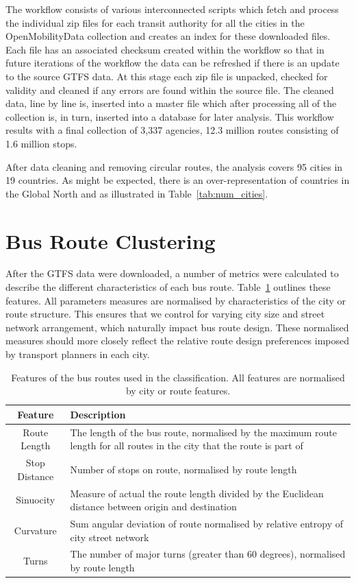 \documentclass[11pt]{article}
\begin{document}
The workflow consists of various interconnected scripts which fetch and process the individual zip files for each transit authority for all the cities in the OpenMobilityData collection and creates an index for these downloaded files.  Each file has an associated checksum created within the workflow so that in future iterations of the workflow the data can be refreshed if there is an update to the source GTFS data. At this stage each zip file is unpacked, checked for validity and cleaned if any errors are found within the source file. The cleaned data, line by line is, inserted into a master file which after processing all of the collection is, in turn, inserted into a database for later analysis. This workflow results with a final collection of 3,337 agencies, 12.3 million routes consisting of 1.6 million stops.  

After data cleaning and removing circular routes, the analysis covers 95 cities in 19 countries. As might be expected, there is an over-representation of countries in the Global North and as illustrated in Table~\ref{tab:num_cities}. 

\section{Bus Route Clustering}\label{clustering}

After the GTFS data were downloaded, a number of metrics were calculated to describe the different characteristics of each bus route. Table~\ref{tab:cluster_features} outlines these features. All parameters measures are normalised by characteristics of the city or route structure. This ensures that we control for varying city size and street network arrangement, which naturally impact bus route design. These normalised measures should more closely reflect the relative route design preferences imposed by transport planners in each city. 

\begin{table}[ht]
\caption{Features of the bus routes used in the classification. All features are normalised by city or route features.}
\begin{center}
\begin{tabular}{c|p{}}
\hline 
Feature & Description \\
\hline 
Route Length & The length of the bus route, normalised by the maximum route length for all routes in the city that the route is part of \\ 
Stop Distance & Number of stops on route, normalised by route length \\
Sinuocity & Measure of actual the route length divided by the Euclidean distance between origin and destination \\
Curvature & Sum angular deviation of route normalised by relative entropy of city street network \citep{boeing_urban_2019} \\
Turns & The number of major turns (greater than 60 degrees), normalised by route length \\
\hline
\end{tabular}
\end{center}
\label{tab:cluster_features}
\end{table}%
\end{document}
